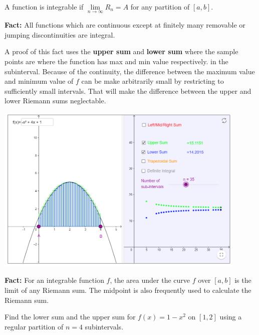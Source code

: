 \begin{definition}

A function is integrable if \(\lim\limits_{n\to \infty}R_n=A\) for any
partition of \([a, b]\).

\end{definition}

\textbf{Fact:} All functions which are continuous except at finitely
many removable or jumping discontinuities are integral.

A proof of this fact uses the \textbf{upper sum} and \textbf{lower sum}
where the sample points are where the function has max and min value
respectively. in the subinterval. Because of the continuity, the
difference between the maximum value and minimum value of \(f\) can be
make arbitrarily small by restricting to sufficiently small intervals.
That will make the difference between the upper and lower Riemann sums
neglectable.

\includegraphics[width=0.9\textwidth]{img/image-20200422234550315.png}

\textbf{Fact:} For an integrable function \(f\), the area under the
curve \(f\) over \([a, b]\) is the limit of any Riemann sum. The
midpoint is also frequently used to calculate the Riemann sum.

\begin{example}

Find the lower sum and the upper sum for \(f(x)=1 - x^2\) on \([1,2]\)
using a regular partition of \(n=4\) subintervals.

\end{example}
\vspace*{6\baselineskip}


